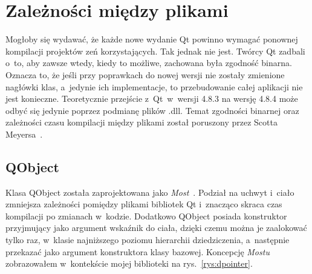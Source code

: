 

\section{Zależności między plikami}
Mogłoby się wydawać, że każde nowe wydanie Qt powinno wymagać ponownej kompilacji projektów zeń korzystających. Tak jednak nie jest. Twórcy Qt zadbali o~to, aby zawsze wtedy, kiedy to możliwe, zachowana była zgodność binarna. Oznacza to, że jeśli przy poprawkach do nowej wersji nie zostały zmienione nagłówki klas, a~jedynie ich implementacje, to przebudowanie całej aplikacji nie jest konieczne. Teoretycznie przejście z~Qt~w~wersji 4.8.3 na wersję 4.8.4 może odbyć się jedynie poprzez podmianę plików .dll. Temat zgodności binarnej oraz zależności czasu kompilacji między plikami został poruszony przez Scotta Meyersa~\cite[150-158]{50Ways}.

\subsection{QObject}
Klasa QObject została zaprojektowana jako \textit{Most}~\cite[181-190]{Patterns}.
Podział na uchwyt i~ciało zmniejsza zależności pomiędzy plikami bibliotek Qt i~znacząco skraca czas kompilacji po zmianach w~kodzie. Dodatkowo QObject posiada konstruktor przyjmujący jako argument wskaźnik do ciała, dzięki czemu można je zaalokować tylko raz, w~klasie najniższego poziomu hierarchii dziedziczenia, a~następnie przekazać jako argument konstruktora klasy bazowej. 
Koncepcję \textit{Mostu} zobrazowałem w~kontekście mojej biblioteki na rys.~\ref{rys:dpointer}.\newline

